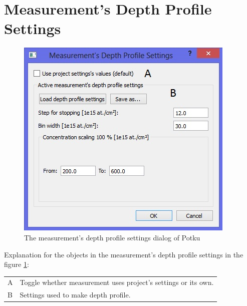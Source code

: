 \documentclass{scrreprt}
\begin{document}
\section{Measurement's Depth Profile Settings}\label{measurement-depthsettings}
\begin{figure}[H]
\centering
\includegraphics[scale=1]{measurement-depthsettings}
\caption{The measurement's depth profile settings dialog of Potku}
\label{fig-depthsettings}
\end{figure}
Explanation for the objects in the measurement's depth profile settings in the figure \ref{fig-depthsettings}:

\begin{tabular}{ll}
A & Toggle whether measurement uses project's settings or its own.\\
B & Settings used to make depth profile.\\
\end{tabular}

\end{document}
